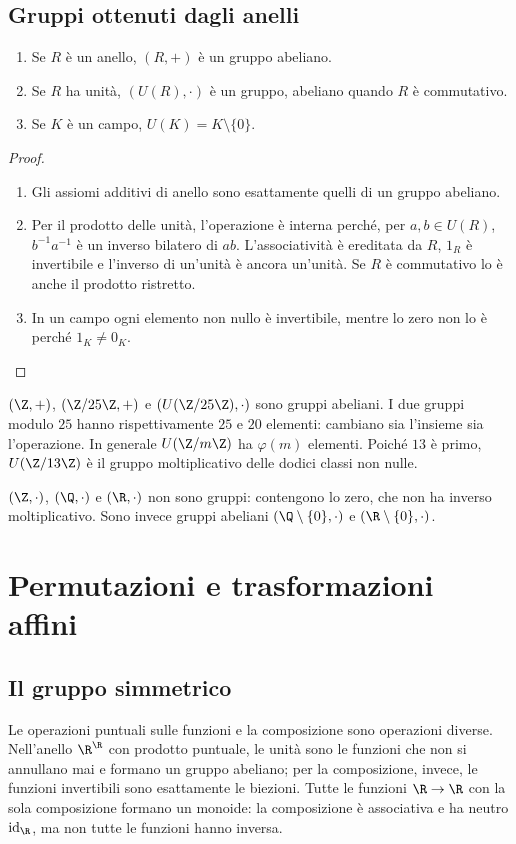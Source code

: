 \subsection{Gruppi ottenuti dagli anelli}
\begin{proposizione}
\begin{enumerate}[label=\arabic*.]
\item Se $R$ è un anello, $(R,+)$ è un gruppo abeliano.
\item Se $R$ ha unità, $(U(R),\cdot)$ è un gruppo, abeliano quando $R$ è commutativo.
\item Se $K$ è un campo, $U(K)=K\setminus\{0\}$.
\end{enumerate}
\end{proposizione}
\begin{proof}
\begin{enumerate}[label=\arabic*.]
\item Gli assiomi additivi di anello sono esattamente quelli di un gruppo abeliano.
\item Per il prodotto delle unità, l'operazione è interna perché, per $a,b\in U(R)$, $b^{-1}a^{-1}$ è un inverso bilatero di $ab$. L'associatività è ereditata da $R$, $1_R$ è invertibile e l'inverso di un'unità è ancora un'unità. Se $R$ è commutativo lo è anche il prodotto ristretto.
\item In un campo ogni elemento non nullo è invertibile, mentre lo zero non lo è perché $1_K\ne0_K$.
\end{enumerate}
\end{proof}

\begin{esempio}
$(\Z,+)$, $(\Z/25\Z,+)$ e $(U(\Z/25\Z),\cdot)$ sono gruppi abeliani. I due gruppi modulo $25$ hanno rispettivamente $25$ e $20$ elementi: cambiano sia l'insieme sia l'operazione. In generale $U(\Z/m\Z)$ ha $\varphi(m)$ elementi. Poiché $13$ è primo, $U(\Z/13\Z)$ è il gruppo moltiplicativo delle dodici classi non nulle.

$(\Z,\cdot)$, $(\Q,\cdot)$ e $(\R,\cdot)$ non sono gruppi: contengono lo zero, che non ha inverso moltiplicativo. Sono invece gruppi abeliani $(\Q\setminus\{0\},\cdot)$ e $(\R\setminus\{0\},\cdot)$.
\end{esempio}

\section{Permutazioni e trasformazioni affini}
\subsection{Il gruppo simmetrico}
Le operazioni puntuali sulle funzioni e la composizione sono operazioni diverse. Nell'anello $\R^{\R}$ con prodotto puntuale, le unità sono le funzioni che non si annullano mai e formano un gruppo abeliano; per la composizione, invece, le funzioni invertibili sono esattamente le biezioni. Tutte le funzioni $\R\to\R$ con la sola composizione formano un monoide: la composizione è associativa e ha neutro $\operatorname{id}_{\R}$, ma non tutte le funzioni hanno inversa.

